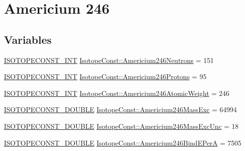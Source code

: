 \hypertarget{group___isotope_const-_americium-_am246}{}\section{Americium 246}
\label{group___isotope_const-_americium-_am246}
\subsection*{Variables}
\begin{DoxyCompactItemize}
\item 
\mbox{\hyperlink{group___isotope_const-_macros_ga5f18360b3e99483a35c32d789e62621c}{I\+S\+O\+T\+O\+P\+E\+C\+O\+N\+S\+T\+\_\+\+I\+NT}} \mbox{\hyperlink{group___isotope_const-_americium-_am246_gacc1a3f2bda3001cd23dad5acf1e08290}{Isotope\+Const\+::\+Americium246\+Neutrons}} = 151
\item 
\mbox{\hyperlink{group___isotope_const-_macros_ga5f18360b3e99483a35c32d789e62621c}{I\+S\+O\+T\+O\+P\+E\+C\+O\+N\+S\+T\+\_\+\+I\+NT}} \mbox{\hyperlink{group___isotope_const-_americium-_am246_gaa92684cd8292162fd4a6059ce5dbbe12}{Isotope\+Const\+::\+Americium246\+Protons}} = 95
\item 
\mbox{\hyperlink{group___isotope_const-_macros_ga5f18360b3e99483a35c32d789e62621c}{I\+S\+O\+T\+O\+P\+E\+C\+O\+N\+S\+T\+\_\+\+I\+NT}} \mbox{\hyperlink{group___isotope_const-_americium-_am246_ga77fe20dd7e17cb9e8afa1da48ba6e5e3}{Isotope\+Const\+::\+Americium246\+Atomic\+Weight}} = 246
\item 
\mbox{\hyperlink{group___isotope_const-_macros_ga8f45a7272ce02c0b4c65c44636ed719a}{I\+S\+O\+T\+O\+P\+E\+C\+O\+N\+S\+T\+\_\+\+D\+O\+U\+B\+LE}} \mbox{\hyperlink{group___isotope_const-_americium-_am246_ga2fe5a19c84a86fb4c310b5b45e3341c1}{Isotope\+Const\+::\+Americium246\+Mass\+Exc}} = 64994
\item 
\mbox{\hyperlink{group___isotope_const-_macros_ga8f45a7272ce02c0b4c65c44636ed719a}{I\+S\+O\+T\+O\+P\+E\+C\+O\+N\+S\+T\+\_\+\+D\+O\+U\+B\+LE}} \mbox{\hyperlink{group___isotope_const-_americium-_am246_gada6c463e61cbb71c5a9e264f38a3c0e1}{Isotope\+Const\+::\+Americium246\+Mass\+Exc\+Unc}} = 18
\item 
\mbox{\hyperlink{group___isotope_const-_macros_ga8f45a7272ce02c0b4c65c44636ed719a}{I\+S\+O\+T\+O\+P\+E\+C\+O\+N\+S\+T\+\_\+\+D\+O\+U\+B\+LE}} \mbox{\hyperlink{group___isotope_const-_americium-_am246_ga0de7fb3d796d481ec2a8b816e837699a}{Isotope\+Const\+::\+Americium246\+Bind\+E\+PerA}} = 7505
\item 

\end{DoxyCompactItemize}
